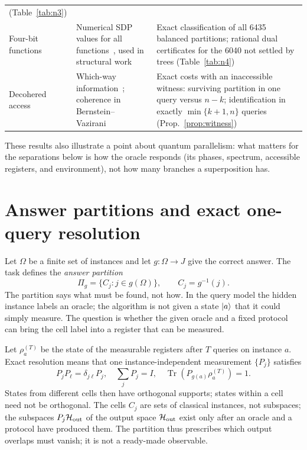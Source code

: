 \documentclass[
  aps,
  pra,
  reprint,
  nofootinbib
]{revtex4-2}
\begin{document}
\begin{table}[t]
\begin{ruledtabular}
\begin{tabular}{p{}p{}p{}}
(Table~\ref{tab:n3})\\
Four-bit functions &
Numerical SDP values for all functions~\cite{MontanaroJozsaMitchison2015},
used in structural work~\cite{YeYangHuang2024} &
Exact classification of all 6435 balanced partitions; rational dual
certificates for the 6040 not settled by trees (Table~\ref{tab:n4})\\
Decohered access &
Which-way information~\cite{Englert1996}; coherence in
Bernstein--Vazirani~\cite{NaseriEtAl2022} &
Exact costs with an inaccessible witness: surviving partition in one query
versus \(n-k\); identification in exactly \(\min\{k+1,n\}\) queries
(Prop.~\ref{prop:witness})\\
\end{tabular}
\end{ruledtabular}
\end{table}

These results also illustrate a point about quantum parallelism: what
matters for the separations below is how the oracle responds (its phases,
spectrum, accessible registers, and environment), not how many branches a
superposition has.

\section{Answer partitions and exact one-query resolution}
\label{sec:criterion}

Let \(\Omega\) be a finite set of instances and let \(g:\Omega\rightarrow J\)
give the correct answer. The task defines the \emph{answer partition}
\begin{equation}
 \Pi_g=\{C_j:j\in g(\Omega)\},\qquad C_j=g^{-1}(j).
 \label{eq:task-partition}
\end{equation}
The partition says what must be found, not how. In the query model the hidden
instance labels an oracle; the algorithm is not given a state
\(\ket a\) that it could simply measure. The question is whether the given
oracle and a fixed protocol can bring the cell label into a register that can
be measured.

Let \(\rho_a^{(T)}\) be the state of the measurable registers after \(T\)
queries on instance \(a\). Exact resolution means that one instance-independent
measurement \(\{P_j\}\) satisfies
\begin{equation}
 P_jP_\ell=\delta_{j\ell}P_j,\quad
 \sum_jP_j=I,\quad
 \operatorname{Tr}(P_{g(a)}\rho_a^{(T)})=1.
 \label{eq:output-sectors}
\end{equation}
States from different cells then have orthogonal supports; states within a
cell need not be orthogonal. The cells \(C_j\) are sets of classical instances,
not subspaces; the subspaces \(P_j\mathcal H_{\rm out}\) of the output space
\(\mathcal H_{\rm out}\) exist only after an oracle and a protocol have
produced them. The partition thus prescribes which output overlaps must
vanish; it is not a ready-made observable.
\end{document}
